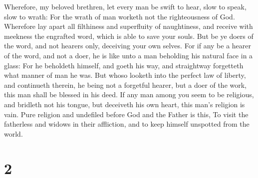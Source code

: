  Wherefore, my beloved brethren, let every man be swift to
hear, slow to speak, slow to wrath:  For the wrath of man
worketh not the righteousness of God.  Wherefore lay apart
all filthiness and superfluity of naughtiness, and receive with meekness
the engrafted word, which is able to save your souls.  But
be ye doers of the word, and not hearers only, deceiving your own
selves.  For if any be a hearer of the word, and not a
doer, he is like unto a man beholding his natural face in a glass:
 For he beholdeth himself, and goeth his way, and
straightway forgetteth what manner of man he was.  But
whoso looketh into the perfect law of liberty, and continueth therein,
he being not a forgetful hearer, but a doer of the work, this man shall
be blessed in his deed.  If any man among you seem to be
religious, and bridleth not his tongue, but deceiveth his own heart,
this man's religion is vain.  Pure religion and undefiled
before God and the Father is this, To visit the fatherless and widows in
their affliction, and to keep himself unspotted from the world.

\hypertarget{section-1}{%
\section{2}\label{section-1}}

